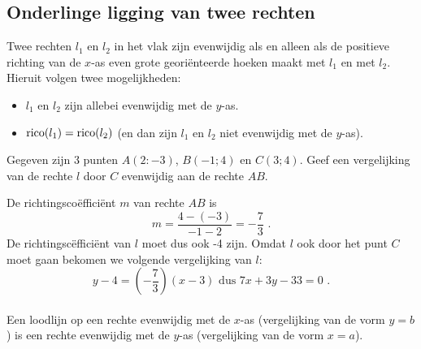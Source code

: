 \subsection{Onderlinge ligging van twee rechten}
\noindent

Twee rechten $l_1$ en $l_2$ in het vlak zijn evenwijdig als en alleen als de positieve richting van de $x$-as even grote geori\"enteerde hoeken maakt met $l_1$ en met $l_2$.
Hieruit volgen twee mogelijkheden:
\begin{itemize}
\item $l_1$ en $l_2$ zijn allebei evenwijdig met de $y$-as.
\item $\operatorname{rico} (l_1)=\operatorname{rico} (l_2)$ (en dan zijn $l_1$ en $l_2$ niet evenwijdig met de $y$-as).
\end{itemize}



\begin{voorbeeld}
Gegeven zijn 3 punten $A(2:-3)$, $B(-1;4)$ en $C(3;4)$.
Geef een vergelijking van de rechte $l$ door $C$ evenwijdig aan de rechte $AB$.

\begin{center}
	
\end{center}


De richtingsco\"effici\"ent $m$ van rechte $AB$ is
\[
m=\frac {4-(-3)}{-1-2}=-\frac {7}{3} \text { .}
\]
De richtingsc\"effici\"ent van $l$ moet dus ook -4 zijn.
Omdat $l$ ook door het punt $C$ moet gaan bekomen we volgende vergelijking van $l$:
\[
y-4=(-\frac {7}{3})(x-3) \text { dus } 7x+3y-33=0 \text { .}
\]\\

Een loodlijn op een rechte evenwijdig met de $x$-as (vergelijking van de vorm $y=b$) is een rechte evenwijdig met de $y$-as (vergelijking van de vorm $x=a$).
\end{voorbeeld}

